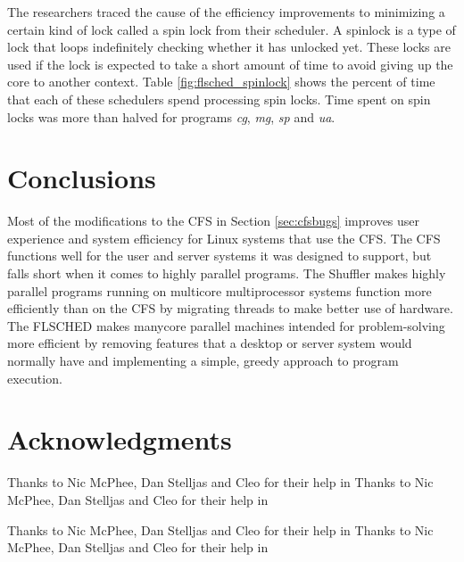 \documentclass{sig-alternate}
\begin{document}
The researchers traced the cause of the efficiency improvements to minimizing a certain kind of lock called a spin lock from their scheduler. A spinlock is a type of lock that loops indefinitely checking whether it has unlocked yet. These locks are used if the lock is expected to take a short amount of time to avoid giving up the core to another context. Table \ref{fig:flsched_spinlock} shows the percent of time that each of these schedulers spend processing spin locks. Time spent on spin locks was more than halved for programs \textit{cg}, \textit{mg}, \textit{sp} and \textit{ua}.~\cite{Jo:2017}


\section{Conclusions}
\label{sec:conclusions}

Most of the modifications to the CFS in Section \ref{sec:cfsbugs} improves user experience and system efficiency for Linux systems that use the CFS. The CFS functions well for the user and server systems it was designed to support, but falls short when it comes to highly parallel programs. The Shuffler makes highly parallel programs running on multicore multiprocessor systems function more efficiently than on the CFS by migrating threads to make better use of hardware. The FLSCHED makes manycore parallel machines intended for problem-solving more efficient by removing features that a desktop or server system would normally have and implementing a simple, greedy approach to program execution.

\section*{Acknowledgments}
\label{sec:acknowledgments}
Thanks to Nic McPhee, Dan Stelljas and Cleo for their help in
Thanks to Nic McPhee, Dan Stelljas and Cleo for their help in

Thanks to Nic McPhee, Dan Stelljas and Cleo for their help in
Thanks to Nic McPhee, Dan Stelljas and Cleo for their help in


  
\end{document}
